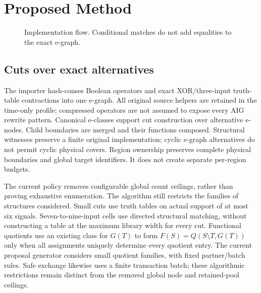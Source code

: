 \documentclass[conference]{IEEEtran}
\begin{document}
\section{Proposed Method}
\begin{figure}[t]
\centering
{}
\caption{Implementation flow. Conditional matches do not add equalities
to the exact e-graph.}
\label{fig:flow}
\end{figure}

\subsection{Cuts over exact alternatives}
The importer hash-conses Boolean operators and exact XOR/three-input truth-table contractions into one e-graph.
All original source helpers are retained in the time-only profile; compressed operators are not assumed to expose every AIG rewrite pattern.
Canonical e-classes support cut construction over alternative e-nodes.
Child boundaries are merged and their functions composed. Structural witnesses preserve a finite original implementation; cyclic e-graph alternatives do not permit cyclic physical covers.
Region ownership preserves complete physical boundaries and global target identifiers. It does not create separate per-region budgets.

The current policy removes configurable global count ceilings, rather than proving exhaustive enumeration. The algorithm still restricts the families of structures considered.
Small cuts use truth tables on actual support of at most six signals.
Seven-to-nine-input cells use directed structural matching, without constructing a table at the maximum library width for every cut.
Functional quotients use an existing class for $G(T)$ to form
$F(S)=Q(S\setminus T,G(T))$ only when all assignments uniquely determine every quotient entry.
The current proposal generator considers small quotient families, with fixed partner/batch rules. Safe exchange likewise uses a finite transaction batch; these algorithmic restrictions remain distinct from the removed global node and retained-pool ceilings.
\end{document}
